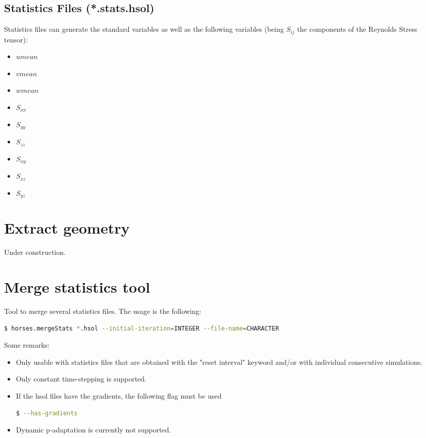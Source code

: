 \documentclass[a4paper,10pt]{report}
\begin{document}
\subsection{Statistics Files (*.stats.hsol)}
Statistics files can generate the standard variables as well as the following variables (being $S_{ij}$ the components of the Reynolds Stress tensor):

\begin{multicols}{3}
\begin{itemize}
\item $umean$
\item $vmean$
\item $wmean$
\item $S_{xx}$
\item $S_{yy}$
\item $S_{zz}$
\item $S_{xy}$
\item $S_{xz}$
\item $S_{yz}$
\end{itemize}
\end{multicols}

\section{Extract geometry}
Under construction.

\section{Merge statistics tool}

Tool to merge several statistics files. The usage is the following:

\begin{lstlisting}[language=bash]
	$ horses.mergeStats *.hsol --initial-iteration=INTEGER --file-name=CHARACTER
\end{lstlisting}

Some remarks:
\begin{itemize}
\item Only usable with statistics files that are obtained with the "reset interval" keyword and/or with individual consecutive simulations.
\item Only constant time-stepping is supported.
\item If the hsol files have the gradients, the following flag must be used
\begin{lstlisting}[language=bash]
	$ --has-gradients
\end{lstlisting}
\item Dynamic p-adaptation is currently not supported.
\end{itemize}
\end{document}
